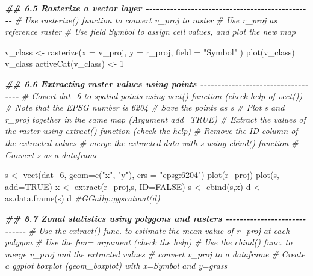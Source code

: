 \documentclass[
  10pt,
  b5paper,
  oneside]{book}
\newenvironment{Shaded}{\begin{snugshade}}{\end{snugshade}}
\newcommand{\AttributeTok}[1]{\textcolor[rgb]{0.77,0.63,0.00}{#1}}
\newcommand{\CommentTok}[1]{\textcolor[rgb]{0.56,0.35,0.01}{\textit{#1}}}
\newcommand{\ConstantTok}[1]{\textcolor[rgb]{0.00,0.00,0.00}{#1}}
\newcommand{\DecValTok}[1]{\textcolor[rgb]{0.00,0.00,0.81}{#1}}
\newcommand{\DocumentationTok}[1]{\textcolor[rgb]{0.56,0.35,0.01}{\textbf{\textit{#1}}}}
\newcommand{\FunctionTok}[1]{\textcolor[rgb]{0.00,0.00,0.00}{#1}}
\newcommand{\NormalTok}[1]{#1}
\newcommand{\OtherTok}[1]{\textcolor[rgb]{0.56,0.35,0.01}{#1}}
\newcommand{\StringTok}[1]{\textcolor[rgb]{0.31,0.60,0.02}{#1}}
\begin{document}
\begin{Shaded}
\begin{Highlighting}[]
\DocumentationTok{\#\# 6.5 Rasterize a vector layer {-}{-}{-}{-}{-}{-}{-}{-}{-}{-}{-}{-}{-}{-}{-}{-}{-}{-}{-}{-}{-}{-}{-}{-}{-}{-}{-}{-}{-}{-}{-}{-}{-}{-}{-}{-}{-}{-}{-}{-}{-}{-}{-}{-}{-}{-}{-}{-}}
\CommentTok{\# Use rasterize() function to convert v\_proj to raster}
\CommentTok{\# Use r\_proj as reference raster}
\CommentTok{\# Use field Symbol to assign cell values, and plot the new map}

\NormalTok{v\_class }\OtherTok{\textless{}{-}} \FunctionTok{rasterize}\NormalTok{(}\AttributeTok{x =}\NormalTok{ v\_proj, }\AttributeTok{y =}\NormalTok{ r\_proj, }\AttributeTok{field =} \StringTok{"Symbol"}\NormalTok{ )}
\FunctionTok{plot}\NormalTok{(v\_class)}
\NormalTok{v\_class}
\FunctionTok{activeCat}\NormalTok{(v\_class) }\OtherTok{\textless{}{-}} \DecValTok{1}

\DocumentationTok{\#\# 6.6 Extracting raster values using points {-}{-}{-}{-}{-}{-}{-}{-}{-}{-}{-}{-}{-}{-}{-}{-}{-}{-}{-}{-}{-}{-}{-}{-}{-}{-}{-}{-}{-}{-}{-}{-}{-}{-}{-}}
\CommentTok{\# Covert dat\_6 to spatial points using vect() function (check help of vect())}
\CommentTok{\# Note that the EPSG number is 6204}
\CommentTok{\# Save the points as s}
\CommentTok{\# Plot s and r\_proj together in the same map (Argument add=TRUE)}
\CommentTok{\# Extract the values of the raster using extract() function (check the help)}
\CommentTok{\# Remove the ID column of the extracted values}
\CommentTok{\# merge the extracted data with s using cbind() function}
\CommentTok{\# Convert s as a dataframe}

\NormalTok{s }\OtherTok{\textless{}{-}} \FunctionTok{vect}\NormalTok{(dat\_6, }\AttributeTok{geom=}\FunctionTok{c}\NormalTok{(}\StringTok{"x"}\NormalTok{, }\StringTok{"y"}\NormalTok{), }\AttributeTok{crs =} \StringTok{"epsg:6204"}\NormalTok{)}
\FunctionTok{plot}\NormalTok{(r\_proj)}
\FunctionTok{plot}\NormalTok{(s, }\AttributeTok{add=}\ConstantTok{TRUE}\NormalTok{)}
\NormalTok{x }\OtherTok{\textless{}{-}} \FunctionTok{extract}\NormalTok{(r\_proj,s, }\AttributeTok{ID=}\ConstantTok{FALSE}\NormalTok{)}
\NormalTok{s }\OtherTok{\textless{}{-}} \FunctionTok{cbind}\NormalTok{(s,x)}
\NormalTok{d }\OtherTok{\textless{}{-}} \FunctionTok{as.data.frame}\NormalTok{(s)}
\NormalTok{d}
\CommentTok{\#GGally::ggscatmat(d)}

\DocumentationTok{\#\# 6.7 Zonal statistics using polygons and rasters {-}{-}{-}{-}{-}{-}{-}{-}{-}{-}{-}{-}{-}{-}{-}{-}{-}{-}{-}{-}{-}{-}{-}{-}{-}{-}{-}{-}{-}}
\CommentTok{\# Use the extract() func. to estimate the mean value of r\_proj at each polygon}
\CommentTok{\# Use the fun= argument (check the help)}
\CommentTok{\# Use the cbind() func. to merge v\_proj and the extracted values}
\CommentTok{\# convert v\_proj to a dataframe}
\CommentTok{\# Create a ggplot boxplot (geom\_boxplot) with x=Symbol and y=grass }


\end{Highlighting}
\end{Shaded}
\end{document}
